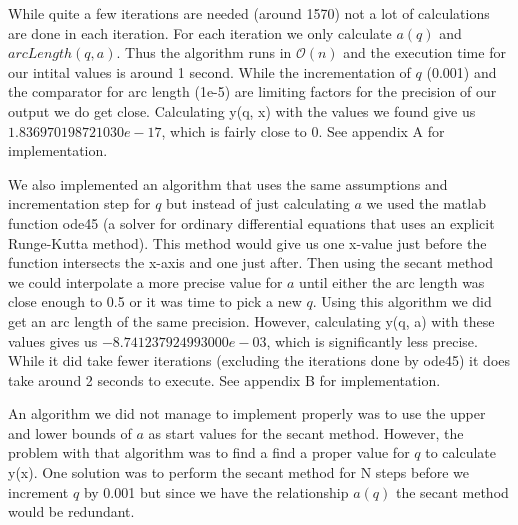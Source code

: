 While quite a few iterations are needed (around 1570) not a lot of calculations are done in each iteration. For each iteration we only calculate $a(q)$ and $arcLength(q, a)$. Thus the algorithm runs in $\mathcal{O}(n)$ and the execution time for our intital values is around 1 second. While the incrementation of $q$ (0.001) and the comparator for arc length (1e-5) are limiting factors for the precision of our output we do get close. Calculating y(q, x) with the values we found give us $1.836970198721030e-17$, which is fairly close to 0. See appendix A for implementation.

We also implemented an algorithm that uses the same assumptions and incrementation step for $q$ but instead of just calculating $a$ we used the matlab function ode45 (a solver for ordinary differential equations that uses an explicit Runge-Kutta method). This method would give us one x-value just before the function intersects the x-axis and one just after. Then using the secant method we could interpolate a more precise value for $a$ until either the arc length was close enough to 0.5 or it was time to pick a new $q$. Using this algorithm we did get an arc length of the same precision. However, calculating y(q, a) with these values gives us $-8.741237924993000e-03$, which is significantly less precise. While it did take fewer iterations (excluding the iterations done by ode45) it does take around 2 seconds to execute. See appendix B for implementation.

An algorithm we did not manage to implement properly was to use the upper and lower bounds of $a$ as start values for the secant method. However, the problem with that algorithm was to find a find a proper value for $q$ to calculate y(x). One solution was to perform the secant method for N steps before we increment $q$ by 0.001 but since we have the relationship $a(q)$ the secant method would be redundant.
